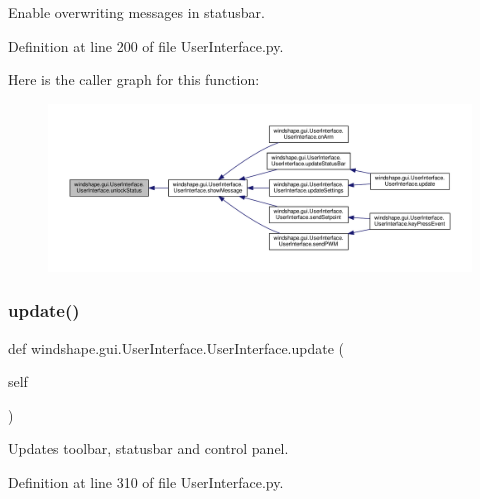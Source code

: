 \begin{DoxyVerb}Enable overwriting messages in statusbar.\end{DoxyVerb}
 

Definition at line 200 of file User\+Interface.\+py.

Here is the caller graph for this function\+:\nopagebreak
\begin{figure}[H]
\begin{center}
\leavevmode
\includegraphics[width=350pt]{classwindshape_1_1gui_1_1_user_interface_1_1_user_interface_a50c3bc558203760d9cd4caebb5fdf319_icgraph}
\end{center}
\end{figure}
\mbox{\label{classwindshape_1_1gui_1_1_user_interface_1_1_user_interface_a65ae15262d2becb2093acd7e54b92fb3}} 
\subsubsection{\texorpdfstring{update()}{update()}}
{\footnotesize\ttfamily def windshape.\+gui.\+User\+Interface.\+User\+Interface.\+update (\begin{DoxyParamCaption}\item[{}]{self }\end{DoxyParamCaption})}

\begin{DoxyVerb}Updates toolbar, statusbar and control panel.\end{DoxyVerb}
 

Definition at line 310 of file User\+Interface.\+py.

